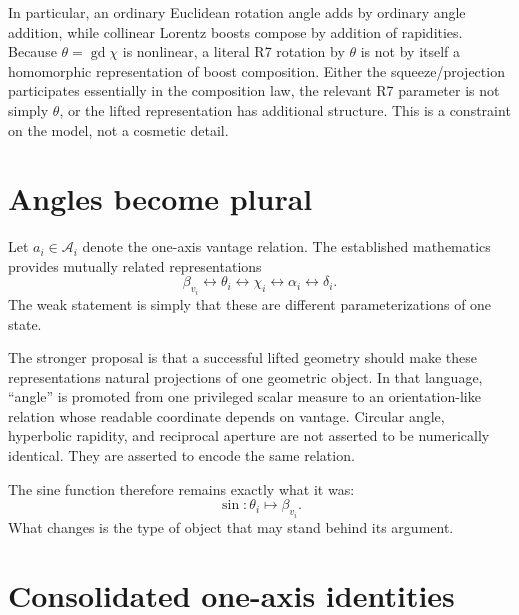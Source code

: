 \documentclass[11pt]{article}
\DeclareMathOperator{\gd}{gd}
\newcommand{\Aspace}{\mathcal{A}}
\begin{document}
In particular, an ordinary Euclidean rotation angle adds by ordinary angle
addition, while collinear Lorentz boosts compose by addition of rapidities.
Because $\theta=\gd\chi$ is nonlinear, a literal R7 rotation by $\theta$ is
not by itself a homomorphic representation of boost composition. Either the
squeeze/projection participates essentially in the composition law, the
relevant R7 parameter is not simply $\theta$, or the lifted representation
has additional structure. This is a constraint on the model, not a cosmetic
detail.

\section{Angles become plural}

Let $a_i\in\Aspace_i$ denote the one-axis vantage relation. The established
mathematics provides mutually related representations
\begin{equation}
\beta_{v_i}
\longleftrightarrow
\theta_i
\longleftrightarrow
\chi_i
\longleftrightarrow
\alpha_i
\longleftrightarrow
\delta_i.
\label{eq:representation-chain}
\end{equation}
The weak statement is simply that these are different parameterizations of
one state.

The stronger proposal is that a successful lifted geometry should make these
representations natural projections of one geometric object. In that
language, ``angle'' is promoted from one privileged scalar measure to an
orientation-like relation whose readable coordinate depends on vantage.
Circular angle, hyperbolic rapidity, and reciprocal aperture are not asserted
to be numerically identical. They are asserted to encode the same relation.

The sine function therefore remains exactly what it was:
\begin{equation}
\sin:\theta_i\mapsto\beta_{v_i}.
\end{equation}
What changes is the type of object that may stand behind its argument.

\section{Consolidated one-axis identities}
\end{document}
